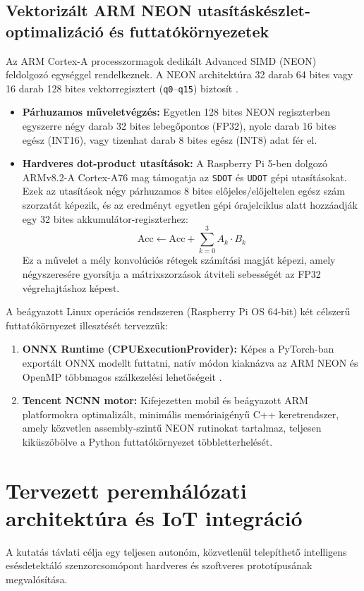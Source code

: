 \documentclass[12pt,a4paper,oneside]{report}
\begin{document}
\subsection{Vektorizált ARM NEON utasításkészlet-optimalizáció és futtatókörnyezetek}
Az ARM Cortex-A processzormagok dedikált Advanced SIMD (NEON) feldolgozó egységgel rendelkeznek. A NEON architektúra 32 darab 64 bites vagy 16 darab 128 bites vektorregisztert (\texttt{q0}--\texttt{q15}) biztosít \cite{armneon2020}.
\begin{itemize}
    \item \textbf{Párhuzamos műveletvégzés:} Egyetlen 128 bites NEON regiszterben egyszerre négy darab 32 bites lebegőpontos (FP32), nyolc darab 16 bites egész (INT16), vagy tizenhat darab 8 bites egész (INT8) adat fér el.
    \item \textbf{Hardveres dot-product utasítások:} A Raspberry Pi 5-ben dolgozó ARMv8.2-A Cortex-A76 mag támogatja az \texttt{SDOT} és \texttt{UDOT} gépi utasításokat. Ezek az utasítások négy párhuzamos 8 bites előjeles/előjeltelen egész szám szorzatát képezik, és az eredményt egyetlen gépi órajelciklus alatt hozzáadják egy 32 bites akkumulátor-regiszterhez:
    \begin{equation}
    \text{Acc} \leftarrow \text{Acc} + \sum_{k=0}^{3} A_k \cdot B_k
    \end{equation}
    Ez a művelet a mély konvolúciós rétegek számítási magját képezi, amely négyszeresére gyorsítja a mátrixszorzások átviteli sebességét az FP32 végrehajtáshoz képest.
\end{itemize}

A beágyazott Linux operációs rendszeren (Raspberry Pi OS 64-bit) két célszerű futtatókörnyezet illesztését tervezzük:
\begin{enumerate}
    \item \textbf{ONNX Runtime (CPUExecutionProvider):} Képes a PyTorch-ban exportált ONNX modellt futtatni, natív módon kiaknázva az ARM NEON és OpenMP többmagos szálkezelési lehetőségeit \cite{onnxruntime2023}.
    \item \textbf{Tencent NCNN motor:} Kifejezetten mobil és beágyazott ARM platformokra optimalizált, minimális memóriaigényű C++ keretrendszer, amely közvetlen assembly-szintű NEON rutinokat tartalmaz, teljesen kiküszöbölve a Python futtatókörnyezet többletterhelését.
\end{enumerate}

\section{Tervezett peremhálózati architektúra és IoT integráció}
A kutatás távlati célja egy teljesen autonóm, közvetlenül telepíthető intelligens esésdetektáló szenzorcsomópont hardveres és szoftveres prototípusának megvalósítása.
\end{document}
